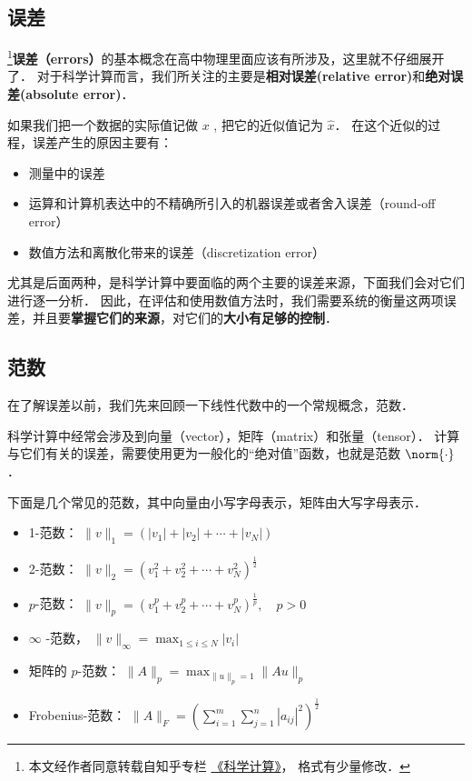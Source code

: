 

\subsection{误差}
\footnote{本文经作者同意转载自知乎专栏 \href{https://www.zhihu.com/column/c_1226443594048942080}{《科学计算》}， 格式有少量修改．}\textbf{误差（errors）}的基本概念在高中物理里面应该有所涉及，这里就不仔细展开了． 对于科学计算而言，我们所关注的主要是\textbf{相对误差(relative error)}和\textbf{绝对误差(absolute error)}．

如果我们把一个数据的实际值记做 $x$ , 把它的近似值记为 $\hat x$． 在这个近似的过程，误差产生的原因主要有：
\begin{itemize}
\item 测量中的误差
\item 运算和计算机表达中的不精确所引入的机器误差或者舍入误差（round-off error）
\item 数值方法和离散化带来的误差（discretization error）
\end{itemize}
尤其是后面两种，是科学计算中要面临的两个主要的误差来源，下面我们会对它们进行逐一分析． 因此，在评估和使用数值方法时，我们需要系统的衡量这两项误差，并且要\textbf{掌握它们的来源}，对它们的\textbf{大小有足够的控制}．

\subsection{范数}
在了解误差以前，我们先来回顾一下线性代数中的一个常规概念，范数．

科学计算中经常会涉及到向量（vector），矩阵（matrix）和张量（tensor）． 计算与它们有关的误差，需要使用更为一般化的“绝对值”函数，也就是范数 $\norm{\cdot}$．

下面是几个常见的范数，其中向量由小写字母表示，矩阵由大写字母表示．
\begin{itemize}
\item 1-范数：  $\|v\|_1=(|v_1|+|v_2|+\cdots+|v_N|)$
\item 2-范数：  $\|v\|_2=(v_1^2+v_2^2+\cdots+v_N^2)^{\frac{1}{2}}$
\item $p$-范数：  $\|v\|_p=(v_1^p+v_2^p+\cdots+v_N^p)^{\frac{1}{p}},\quad p>0$
\item $\infty$  -范数，  $\|v\|_{\infty}=\max_{1\le i \le N}|v_i|$
\item 矩阵的 $p$-范数：  $\|A\|_p=\max_{\|u\|_p=1}\|Au\|_p$
\item Frobenius-范数：  $\|A\|_F=(\sum_{i=1}^m\sum_{j=1}^n|a_{ij}|^2)^{\frac{1}{2}}$
\end{itemize}

